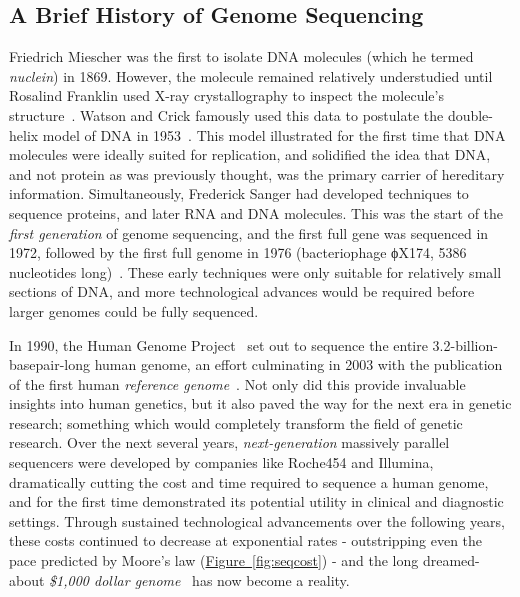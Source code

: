 \begin{justify}
\subsection{A Brief History of Genome Sequencing}
Friedrich Miescher was the first to isolate DNA molecules (which he termed \emph{nuclein}) in 1869. However, the molecule remained relatively understudied until Rosalind Franklin used X-ray crystallography to inspect the molecule's structure~\cite{elkin2003rosalind}. Watson and Crick famously used this data to postulate the double-helix model of DNA in 1953~\cite{watson1953molecular}. This model illustrated for the first time that DNA molecules were ideally suited for replication, and solidified the idea that DNA, and not protein as was previously thought, was the primary carrier of hereditary information. Simultaneously, Frederick Sanger had developed techniques to sequence proteins, and later RNA and DNA molecules. This was the start of the \emph{first generation} of genome sequencing, and the first full gene was sequenced in 1972, followed by the first full genome in 1976 (bacteriophage ϕX174, 5386 nucleotides long)~\cite{sanger1977dna}. These early techniques were only suitable for relatively small sections of DNA, and more technological advances would be required before larger genomes could be fully sequenced.

In 1990, the Human Genome Project~\cite{olson1993human} set out to sequence the entire 3.2-billion-basepair-long human genome, an effort culminating in 2003 with the publication of the first human \textit{reference genome}~\cite{international2004finishing}. Not only did this provide invaluable insights into human genetics, but it also paved the way for the next era in genetic research; something which would completely transform the field of genetic research. Over the next several years, \emph{next-generation} massively parallel sequencers were developed by companies like Roche454 and Illumina, dramatically cutting the cost and time required to sequence a human genome, and for the first time demonstrated its potential utility in clinical and diagnostic settings. Through sustained technological advancements over the following years, these costs continued to decrease at exponential rates - outstripping even the pace predicted by Moore's law (\hyperref[fig:seqcost]{Figure~\ref{fig:seqcost}}) - and the long dreamed-about \textit{\$1,000 dollar genome}~\cite{thousanddollargenome, sequencingcostsNHGRI} has now become a reality.


\end{justify}
